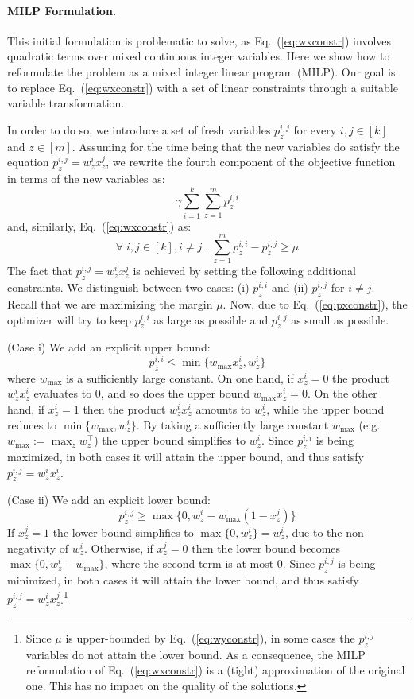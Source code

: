 \documentclass{article}
\renewcommand\[{\begin{equation}}
\renewcommand\]{\end{equation}}
\begin{document}
\paragraph{MILP Formulation.} This initial formulation is problematic to solve,
as Eq.~(\ref{eq:wxconstr}) involves quadratic terms over mixed continuous integer variables. 
Here we show how to reformulate the
problem as a mixed integer linear program (MILP). Our goal is to
replace Eq.~(\ref{eq:wxconstr}) with a set of linear constraints through
a suitable variable transformation.

In order to do so, we introduce a set of fresh variables $p^{i,j}_z$ for every
$i,j\in[k]$ and $z\in[m]$. Assuming for the time being that the new variables
do satisfy the equation $p^{i,j}_z = w^i_z x^j_z$, we rewrite the fourth
component of the objective function in terms of the new variables as:
%
$$ \gamma \sum_{i=1}^k \sum_{z=1}^m p^{i,i}_z$$
%
and, similarly, Eq.~(\ref{eq:wxconstr}) as:
%
\[ \forall \; i, j \in [k], i \neq j \;.\; \sum_{z=1}^m p^{i,i}_z - p^{i,j}_z \ge \mu \label{eq:pxconstr} \]
%
The fact that $p^{i,j}_z = w^{i}_z x^{j}_z$ is achieved by
setting the following additional constraints. We distinguish between two cases:
(i) $p^{i,i}_z$ and (ii) $p^{i,j}_z$ for $i \ne j$.  Recall that we are
maximizing the margin $\mu$. Now, due to Eq.~(\ref{eq:pxconstr}), the optimizer will
try to keep $p^{i,i}_z$ as large as possible and $p^{i,j}_z$ as small as
possible.

(Case i) We add an explicit upper bound:
%
$$ p^{i,i}_z \le \min \{ w_\text{max} x^{i}_z, w^{i}_z \} $$
%
where $w_\text{max}$ is a sufficiently large constant.
On one hand, if $x^i_z = 0$ the product $w^i_z x^i_z$ evaluates to $0$, and so does
the upper bound $w_\text{max} x^{i}_z = 0$. On the other hand, if $x^i_z=1$
then the product $w^i_z x^i_z$ amounts to $w^i_z$, while the upper
bound reduces to $\min \{ w_\text{max}, w^{i}_z \}$. By taking a sufficiently
large constant $w_\text{max}$ (e.g. $w_\text{max} := \max_z w^\top_z$) the
upper bound simplifies to $w^i_z$. Since $p^{i,i}_z$ is being maximized, in
both cases it will attain the upper bound, and thus satisfy $p^{i,j}_z = w^i_z x^i_z$.

(Case ii) We add an explicit lower bound:
%
$$ p^{i,j}_z \ge \max \{ 0, w^{i}_z - w_\text{max}(1 - x^{j}_z) \} $$
%
If $x^j_z = 1$ the lower bound simplifies to $\max \{ 0, w^{i}_z \} = w^{i}_z$,
due to the non-negativity of $w^i_z$. Otherwise, if $x^j_z = 0$
then the lower bound becomes $\max \{ 0, w^{i}_z - w_\text{max} \}$, where
the second term is at most $0$. Since $p^{i,j}_z$ is being minimized, in both
cases it will attain the lower bound, and thus satisfy $p^{i,j}_z = w^i_z
x^j_z$.\footnote{Since $\mu$ is upper-bounded by Eq.~(\ref{eq:wyconstr}), in some
cases the $p^{i,j}_z$ variables do not attain the lower bound. As a
consequence, the MILP reformulation of Eq.~(\ref{eq:wxconstr}) is a (tight)
approximation of the original one. This has no impact on the quality of the
solutions.}
\end{document}

